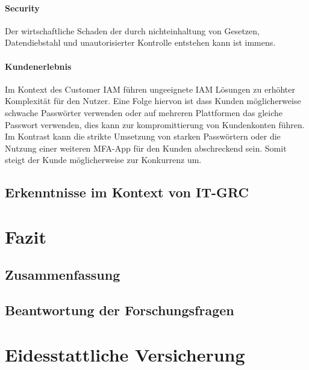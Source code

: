 \documentclass[10pt]{article}
\begin{document}
\paragraph{Security}
Der wirtschaftliche Schaden der durch nichteinhaltung von Gesetzen, Datendiebstahl und unautorisierter Kontrolle entstehen kann ist immens.~\cite{azhar2014economics}
\paragraph{Kundenerlebnis}
Im Kontext des Customer IAM führen ungeeignete IAM Lösungen zu erhöhter Komplexität für den Nutzer. Eine Folge hiervon ist dass Kunden möglicherweise schwache Passwörter verwenden oder auf mehreren Plattformen das gleiche Passwort verwenden, dies kann zur kompromittierung von Kundenkonten führen. Im Kontrast kann die strikte Umsetzung von starken Passwörtern oder die Nutzung einer weiteren MFA-App für den Kunden abschreckend sein. Somit steigt der Kunde möglicherweise zur Konkurrenz um.~\cite{azhar2014economics}
\subsection{Erkenntnisse im Kontext von IT-GRC}
\section{Fazit}
\subsection{Zusammenfassung}
\subsection{Beantwortung der Forschungsfragen}
\section{Eidesstattliche Versicherung}
\newpage
\printbibliography[notkeyword={quelle}, title={Literaturverzeichnis}]
\newpage
\printbibliography[keyword={quelle}, title={Quellenverzeichnis}]
\newpage
\listoffigures
\end{document}

